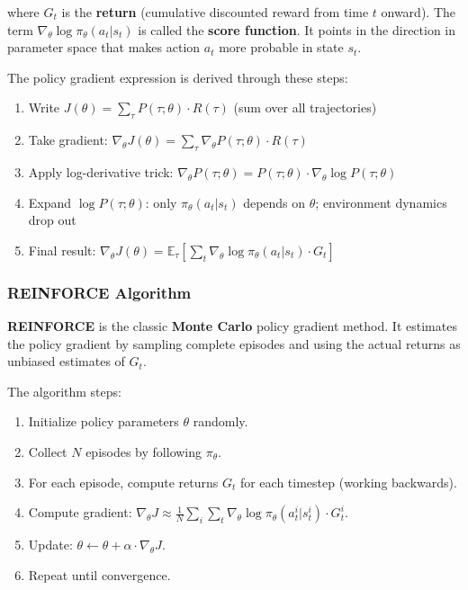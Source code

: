\documentclass[11pt,a4paper]{article}
\begin{document}
where $G_t$ is the \textbf{return} (cumulative discounted reward from time $t$ onward). The term $\nabla_\theta \log \pi_\theta(a_t | s_t)$ is called the \textbf{score function}. It points in the direction in parameter space that makes action $a_t$ more probable in state $s_t$.

The policy gradient expression is derived through these steps:
\begin{enumerate}
    \item Write $J(\theta) = \sum_\tau P(\tau; \theta) \cdot R(\tau)$ (sum over all trajectories)
    \item Take gradient: $\nabla_\theta J(\theta) = \sum_\tau \nabla_\theta P(\tau; \theta) \cdot R(\tau)$
    \item Apply log-derivative trick: $\nabla_\theta P(\tau; \theta) = P(\tau; \theta) \cdot \nabla_\theta \log P(\tau; \theta)$
    \item Expand $\log P(\tau; \theta)$: only $\pi_\theta(a_t|s_t)$ depends on $\theta$; environment dynamics drop out
    \item Final result: $\nabla_\theta J(\theta) = \mathbb{E}_\tau[\sum_t \nabla_\theta \log \pi_\theta(a_t|s_t) \cdot G_t]$
\end{enumerate}

\subsubsection{REINFORCE Algorithm}

\textbf{REINFORCE} is the classic \textbf{Monte Carlo} policy gradient method. It estimates the policy gradient by sampling complete episodes and using the actual returns as unbiased estimates of $G_t$.

The algorithm steps:
\begin{enumerate}
    \item Initialize policy parameters $\theta$ randomly.
    \item Collect $N$ episodes by following $\pi_\theta$.
    \item For each episode, compute returns $G_t$ for each timestep (working backwards).
    \item Compute gradient: $\nabla_\theta J \approx \frac{1}{N}\sum_i \sum_t \nabla_\theta \log \pi_\theta(a_t^i | s_t^i) \cdot G_t^i$.
    \item Update: $\theta \leftarrow \theta + \alpha \cdot \nabla_\theta J$.
    \item Repeat until convergence.
\end{enumerate}
\end{document}
